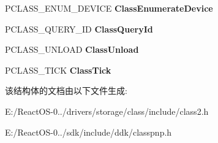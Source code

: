 \begin{DoxyCompactItemize}
\item 
\mbox{\label{struct___c_l_a_s_s___i_n_i_t___d_a_t_a_aa4dcb62384362dba23b32a46a0ecf082}} 
P\+C\+L\+A\+S\+S\+\_\+\+E\+N\+U\+M\+\_\+\+D\+E\+V\+I\+CE {\bfseries Class\+Enumerate\+Device}
\item 
\mbox{\label{struct___c_l_a_s_s___i_n_i_t___d_a_t_a_a53accf0e13cf198775223af4d36c89d1}} 
P\+C\+L\+A\+S\+S\+\_\+\+Q\+U\+E\+R\+Y\+\_\+\+ID {\bfseries Class\+Query\+Id}
\item 
\mbox{\label{struct___c_l_a_s_s___i_n_i_t___d_a_t_a_a9ab9b483ba1b06dd675869b7204395f8}} 
P\+C\+L\+A\+S\+S\+\_\+\+U\+N\+L\+O\+AD {\bfseries Class\+Unload}
\item 
\mbox{\label{struct___c_l_a_s_s___i_n_i_t___d_a_t_a_ae40deb254f0963590ab28e27e3230516}} 
P\+C\+L\+A\+S\+S\+\_\+\+T\+I\+CK {\bfseries Class\+Tick}
\end{DoxyCompactItemize}


该结构体的文档由以下文件生成\+:\begin{DoxyCompactItemize}
\item 
E\+:/\+React\+O\+S-\/0../drivers/storage/class/include/class2.\+h\item 
E\+:/\+React\+O\+S-\/0../sdk/include/ddk/classpnp.\+h\end{DoxyCompactItemize}
